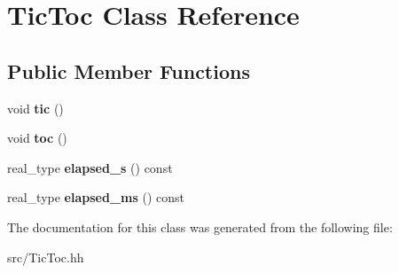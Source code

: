 \hypertarget{class_tic_toc}{}\section{Tic\+Toc Class Reference}
\label{class_tic_toc}
\subsection*{Public Member Functions}
\begin{DoxyCompactItemize}
\item 
\mbox{\label{class_tic_toc_a5d76802851d3cbc366b4ccccb7257e2e}} 
void {\bfseries tic} ()
\item 
\mbox{\label{class_tic_toc_a911de3386cba55c573850588f0080007}} 
void {\bfseries toc} ()
\item 
\mbox{\label{class_tic_toc_acf23c55f595a03da92bda44a2127143d}} 
real\+\_\+type {\bfseries elapsed\+\_\+s} () const
\item 
\mbox{\label{class_tic_toc_a2cf72ce8e4452dca5c05e38002281312}} 
real\+\_\+type {\bfseries elapsed\+\_\+ms} () const
\end{DoxyCompactItemize}


The documentation for this class was generated from the following file\+:\begin{DoxyCompactItemize}
\item 
src/Tic\+Toc.\+hh\end{DoxyCompactItemize}
